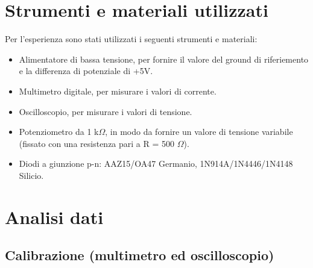 \documentclass[a4paper, 11pt]{article}
\begin{document}
\section{Strumenti e materiali utilizzati}
Per l'esperienza sono stati utilizzati i seguenti strumenti e materiali:
\begin{itemize}
    \item Alimentatore di bassa tensione, per fornire il valore del ground di riferiemento e la differenza di potenziale di +5V.
    \item Multimetro digitale, per misurare i valori di corrente.
    \item Oscilloscopio, per misurare i valori di tensione.
    \item Potenziometro da 1 k$\Omega$, in modo da fornire un valore di tensione variabile (fissato con una resistenza pari a R = 500 $\Omega$).
    \item Diodi a giunzione p-n: AAZ15/OA47 Germanio, 1N914A/1N4446/1N4148 Silicio. 
\end{itemize}

\section{Analisi dati}

\subsection{Calibrazione (multimetro ed oscilloscopio)}
\end{document}
